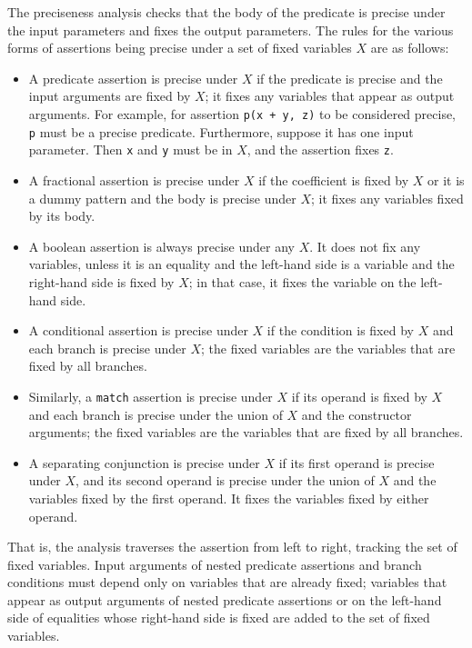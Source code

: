 \documentclass{article}
\begin{document}
The preciseness analysis checks that the body of the predicate
is precise under the input parameters and fixes the output
parameters. The rules for the various forms of assertions being
precise under a set of fixed variables $X$ are as follows:
\begin{itemize}
\item A predicate assertion is precise under $X$ if the
    predicate is precise and the input arguments are fixed
    by $X$; it fixes any variables that appear as output
    arguments. For example, for assertion %
    \lstinline|p(x + y, z)| to be considered precise,
    \lstinline|p| must be a precise predicate. Furthermore,
    suppose it has one input parameter. Then \lstinline|x|
    and \lstinline|y| must be in $X$, and the assertion
    fixes \lstinline|z|.
\item A fractional assertion is precise under $X$ if the
    coefficient is fixed by $X$ or it is a dummy pattern
    and the body is precise under $X$; it fixes any
    variables fixed by its body.
\item A boolean assertion is always precise under any $X$.
    It does not fix any variables, unless it is an equality
    and the left-hand side is a variable and the right-hand
    side is fixed by $X$; in that case, it fixes the
    variable on the left-hand side.
\item A conditional assertion is precise under $X$ if the
    condition is fixed by $X$ and each branch is precise
    under $X$; the fixed variables are the variables that
    are fixed by all branches.
\item Similarly, a \lstinline|match| assertion is precise
    under $X$ if its operand is fixed by $X$ and each
    branch is precise under the union of $X$ and the
    constructor arguments; the fixed variables are the
    variables that are fixed by all branches.
\item A separating conjunction is precise under $X$ if its
    first operand is precise under $X$, and its second
    operand is precise under the union of $X$ and the
    variables fixed by the first operand. It fixes the
    variables fixed by either operand.
\end{itemize}
That is, the analysis traverses the assertion from left to
right, tracking the set of fixed variables. Input arguments of
nested predicate assertions and branch conditions must depend
only on variables that are already fixed; variables that appear
as output arguments of nested predicate assertions or on the
left-hand side of equalities whose right-hand side is fixed are
added to the set of fixed variables.
\end{document}

